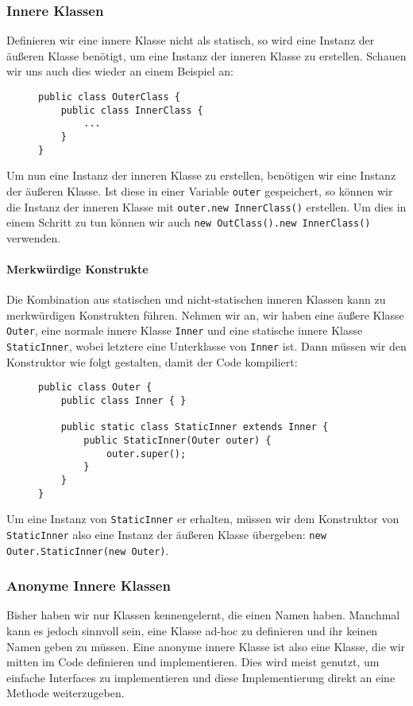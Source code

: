 	\subsubsection{Innere Klassen}
		Definieren wir eine innere Klasse nicht als statisch, so wird eine Instanz der äußeren Klasse benötigt, um eine Instanz der inneren Klasse zu erstellen. Schauen wir uns auch dies wieder an einem Beispiel an:
		\begin{figure}[H]
			\centering
			\begin{lstlisting}
public class OuterClass {
	public class InnerClass {
		...
	}
}
\end{lstlisting}
		\end{figure}
		Um nun eine Instanz der inneren Klasse zu erstellen, benötigen wir eine Instanz der äußeren Klasse. Ist diese in einer Variable \lstinline|outer| gespeichert, so können wir die Instanz der inneren Klasse mit \lstinline|outer.new InnerClass()| erstellen. Um dies in einem Schritt zu tun können wir auch \lstinline|new OutClass().new InnerClass()| verwenden.
		
		\paragraph{Merkwürdige Konstrukte}
			Die Kombination aus statischen und nicht-statischen inneren Klassen kann zu merkwürdigen Konstrukten führen. Nehmen wir an, wir haben eine äußere Klasse \lstinline|Outer|, eine normale innere Klasse \lstinline|Inner| und eine statische innere Klasse \lstinline|StaticInner|, wobei letztere eine Unterklasse von \lstinline|Inner| ist. Dann müssen wir den Konstruktor wie folgt gestalten, damit der Code kompiliert:
			\begin{figure}[H]
				\centering
				\begin{lstlisting}
public class Outer {
	public class Inner { }
	
	public static class StaticInner extends Inner {
		public StaticInner(Outer outer) {
			outer.super();
		}
	}
}
\end{lstlisting}
			\end{figure}
			Um eine Instanz von \lstinline|StaticInner| er erhalten, müssen wir dem Konstruktor von \lstinline|StaticInner| also eine Instanz der äußeren Klasse übergeben: \lstinline|new Outer.StaticInner(new Outer)|.
	
	\subsubsection{Anonyme Innere Klassen}
		Bisher haben wir nur Klassen kennengelernt, die einen Namen haben. Manchmal kann es jedoch sinnvoll sein, eine Klasse ad-hoc zu definieren und ihr keinen Namen geben zu müssen. Eine anonyme innere Klasse ist also eine Klasse, die wir mitten im Code definieren und implementieren. Dies wird meist genutzt, um einfache Interfaces zu implementieren und diese Implementierung direkt an eine Methode weiterzugeben.
		
